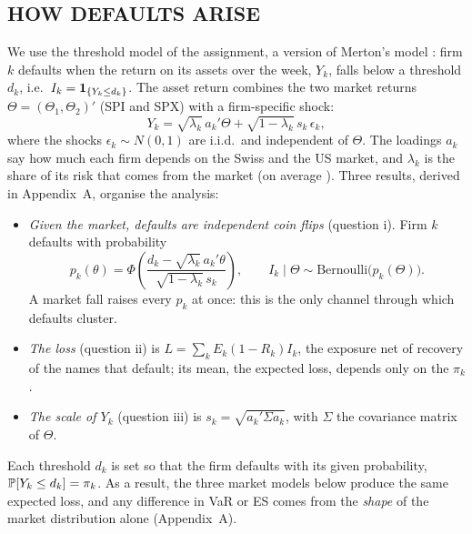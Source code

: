 \subsection{HOW DEFAULTS ARISE}
We use the threshold model of the assignment, a version of Merton's model \citep[Ch.~2]{DeGiorgi26}: firm $k$ defaults when the return on its assets over the week, $Y_k$, falls below a threshold $d_k$, i.e.\ $I_k=\ind_{\{Y_k\le d_k\}}$. The asset return combines the two market returns $\Theta=(\Theta_1,\Theta_2)'$ (SPI and SPX) with a firm-specific shock:
\begin{equation}
\label{eq:Yk}
Y_k=\sqrt{\lambda_k}\,a_k'\Theta+\sqrt{1-\lambda_k}\,s_k\,\epsilon_k ,
\end{equation}
where the shocks $\epsilon_k\sim N(0,1)$ are i.i.d.\ and independent of $\Theta$. The loadings $a_k$ say how much each firm depends on the Swiss and the US market, and $\lambda_k$ is the share of its risk that comes from the market (on average ). Three results, derived in Appendix~A, organise the analysis:
\begin{itemize}
\item \emph{Given the market, defaults are independent coin flips} (question i). Firm $k$ defaults with probability
\[
p_k(\theta)=\Phi\!\left(\frac{d_k-\sqrt{\lambda_k}\,a_k'\theta}{\sqrt{1-\lambda_k}\,s_k}\right),\qquad I_k\mid\Theta\sim\mathrm{Bernoulli}\big(p_k(\Theta)\big).
\]
A market fall raises every $p_k$ at once: this is the only channel through which defaults cluster.
\item \emph{The loss} (question ii) is $L=\sum_kE_k(1-R_k)I_k$, the exposure net of recovery of the names that default; its mean, the expected loss, depends only on the $\pi_k$.
\item \emph{The scale of $Y_k$} (question iii) is $s_k=\sqrt{a_k'\Sigma a_k}$, with $\Sigma$ the covariance matrix of $\Theta$.
\end{itemize}
Each threshold $d_k$ is set so that the firm defaults with its given probability, $\P[Y_k\le d_k]=\pi_k$. As a result, the three market models below produce the same expected loss, and any difference in VaR or ES comes from the \emph{shape} of the market distribution alone (Appendix~A).

